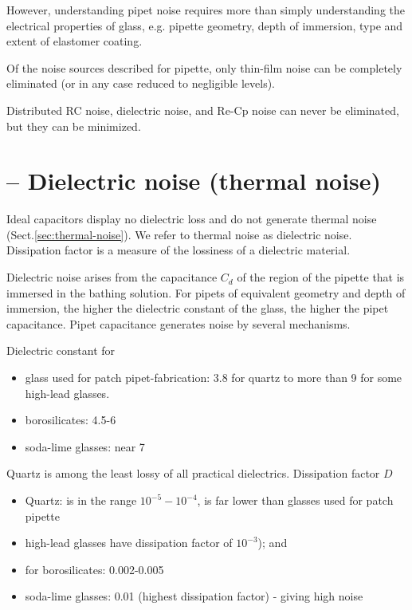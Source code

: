 However, understanding pipet noise requires more
than simply understanding the electrical properties of glass, e.g. pipette
geometry, depth of immersion, type and extent of elastomer coating.

Of the noise sources described for pipette, only thin-film noise can be
completely eliminated (or in any case reduced to negligible levels).

Distributed RC noise, dielectric noise, and Re-Cp noise can
never be eliminated, but they can be minimized.


\section{-- Dielectric noise (thermal noise)}
\label{sec:dielectric-noise}

Ideal capacitors display no dielectric loss and do not generate thermal noise
(Sect.\ref{sec:thermal-noise}).
We refer to thermal noise as dielectric noise.
Dissipation factor is a measure of the lossiness of a dielectric material.

Dielectric noise arises from the capacitance $C_d$ of the region of the pipette
that is immersed in the bathing solution. For pipets of equivalent geometry and
depth of immersion, the higher the dielectric constant of the glass, the higher
the pipet capacitance. Pipet capacitance generates noise by several mechanisms.

Dielectric constant for
\begin{itemize}
  \item glass used for patch pipet-fabrication: 3.8 for quartz to more than 9
  for some high-lead glasses.

  \item borosilicates: 4.5-6

  \item soda-lime glasses: near 7
\end{itemize}

Quartz is among the least lossy of all practical dielectrics.
Dissipation factor $D$
\begin{itemize}
  \item Quartz:  is in the range $10^{-5} - 10^{-4}$, is far lower than
glasses used for patch pipette

  \item high-lead glasses have dissipation factor of $10^{-3}$); and

  \item for borosilicates: 0.002-0.005

  \item soda-lime glasses: 0.01 (highest dissipation factor) - giving high noise
\end{itemize}

